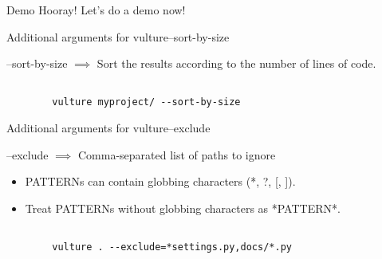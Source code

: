 \documentclass{beamer}
\begin{document}

\begin{frame}{Demo}
\alert{Hooray! Let's do a demo now!}
    
\end{frame}

\begin{frame}{Additional arguments for vulture}{--sort-by-size}

--sort-by-size \begin{math} \implies \end{math} Sort the results according to the number of lines of code.

\begin{example}
    \begin{verbatim}

        vulture myproject/ --sort-by-size

    \end{verbatim}

\end{example}
\end{frame}


\begin{frame}{Additional arguments for vulture}{--exclude}
    
--exclude \begin{math} \implies \end{math} Comma-separated list of paths to ignore 

\begin{itemize}
    \item PATTERNs can contain globbing
    characters (*, ?, [, ]).
    \item Treat PATTERNs without
    globbing characters as *PATTERN*.
\end{itemize}


\begin{example}
        \begin{verbatim}

        vulture . --exclude=*settings.py,docs/*.py

        \end{verbatim}
        
\end{example}
\end{frame}
\end{document}

